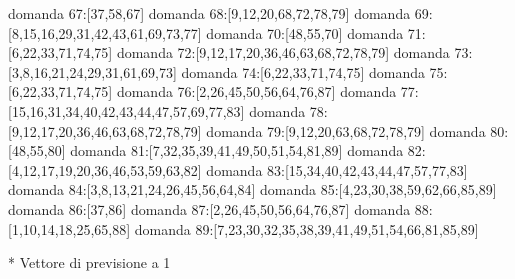 domanda 67:[37,58,67]
domanda 68:[9,12,20,68,72,78,79]
domanda 69:[8,15,16,29,31,42,43,61,69,73,77]
domanda 70:[48,55,70]
domanda 71:[6,22,33,71,74,75]
domanda 72:[9,12,17,20,36,46,63,68,72,78,79]
domanda 73:[3,8,16,21,24,29,31,61,69,73]
domanda 74:[6,22,33,71,74,75]
domanda 75:[6,22,33,71,74,75]
domanda 76:[2,26,45,50,56,64,76,87]
domanda 77:[15,16,31,34,40,42,43,44,47,57,69,77,83]
domanda 78:[9,12,17,20,36,46,63,68,72,78,79]
domanda 79:[9,12,20,63,68,72,78,79]
domanda 80:[48,55,80]
domanda 81:[7,32,35,39,41,49,50,51,54,81,89]
domanda 82:[4,12,17,19,20,36,46,53,59,63,82]
domanda 83:[15,34,40,42,43,44,47,57,77,83]
domanda 84:[3,8,13,21,24,26,45,56,64,84]
domanda 85:[4,23,30,38,59,62,66,85,89]
domanda 86:[37,86]
domanda 87:[2,26,45,50,56,64,76,87]
domanda 88:[1,10,14,18,25,65,88]
domanda 89:[7,23,30,32,35,38,39,41,49,51,54,66,81,85,89]

* Vettore di previsione a 1

